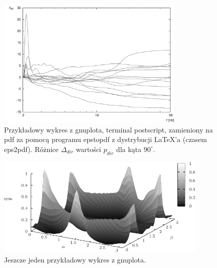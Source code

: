\documentclass{article}
\begin{document}
\begin{figure}
\begin{center}
\includegraphics[width=0.8\textwidth]{rys_wykres2d.pdf}
\end{center}
\caption{Przykładowy wykres z gnuplota, terminal postscript, zamieniony na pdf za pomocą programu epstopdf z dystrybucji LaTeX'a (czasem eps2pdf). Różnice $\Delta_{dir}$ wartości $p_{dir}$ dla kąta $90^\circ$.}
\label{fig-1Tdelta}
\end{figure}

\begin{figure}
\begin{center}
\includegraphics[width=0.9\textwidth]{rys_wykres3d.pdf}
\end{center}
\caption{Jeszcze jeden przykładowy wykres z gnuplota.}
\label{fig-3d}
\end{figure}
\end{document}
